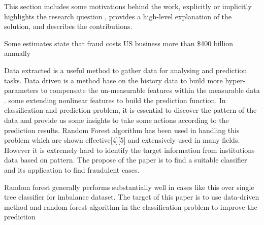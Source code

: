 This section includes some motivations behind the work, explicitly or implicitly highlights the research question , provides a high-level explanation of the solution, and describes the contributions.

Some estimates state that fraud costs US business more than \$400 billion annually 

Data extracted is a useful method to gather data for analysing and prediction tasks. Data driven is a method base on the history data to build more hyper-parameters to compensate the un-measurable features within the measurable data \cite{SMARRA20181252}. some extending nonlinear features to build the prediction function. In classification and prediction problem, it is essential to discover the pattern of the data and provide us some insights to take some actions according to the prediction results. Random Forest algorithm has been used in handling this problem which are shown effective[4][5] and extensively used in many fields. However it is extremely hard to identify the target information from institutions data based on pattern. The propose of the paper is to find a suitable classifier and its application to find fraudulent cases. 

Random forest generally performs substantially well in cases like this over single tree classifier for imbalance dataset. The target of this paper is to use data-driven method and random forest algorithm in the classification problem to improve the prediction 